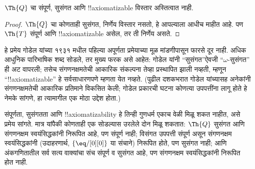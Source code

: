 \documentclass[../../../include/open-logic-section]{subfiles}
\begin{document}


\begin{thm}
$\Th{Q}$ चा संपूर्ण, सुसंगत आणि !!{axiomatizable} विस्तार
अस्तित्वात नाही.
\end{thm}

\begin{proof}
$\Th{Q}$ चा कोणताही सुसंगत, निर्णेय विस्तार नसतो, हे
आपल्याला आधीच माहीत आहे. पण $\Th{T}$ संपूर्ण आणि
!!{axiomatizable} असेल, तर ती निर्णेय असते.
\end{proof}

\begin{explain}
हे प्रमेय गोडेल यांच्या १९३१ मधील पहिल्या अपूर्णता प्रमेयाच्या
मूळ मांडणीपासून फारसे दूर नाही. अधिक आधुनिक पारिभाषिक शब्द
सोडले, तर मुख्य फरक असे आहेत: गोडेल यांनी ``सुसंगत''ऐवजी
``$\omega$-सुसंगत'' ही अट वापरली; तसेच संगणनक्षमतेची आकारिक
संकल्पना तेव्हा प्रस्थापित झाली नव्हती, म्हणून ``!!{axiomatizable}''
हे सर्वसाधारणपणे म्हणता येत नव्हते. (पुढील दशकभरात गोडेल
यांच्यासह अनेकांनी संगणनक्षमतेची आकारिक प्रतिमाने विकसित केली;
गोडेल प्रकारची घटना कोणत्या उपपत्तींना लागू होते हे नेमके
सांगणे, हा त्यामागील एक मोठा उद्देश होता.)

संपूर्णता, सुसंगतता आणि !!{axiomatizability} हे तिन्ही गुणधर्म
एकाच वेळी मिळू शकत नाहीत, असे प्रमेय सांगते. मात्र यांपैकी
कोणताही एक सोडल्यास उरलेले दोन मिळू शकतात: $\Th{Q}$ सुसंगत
आणि संगणनक्षम स्वयंसिद्धकांनी निरूपित आहे, पण संपूर्ण नाही;
विसंगत उपपत्ती संपूर्ण असून संगणनक्षम स्वयंसिद्धकांनी
(उदाहरणार्थ, $\{ \eq/[0][0] \}$ या संचाने) निरूपित होते,
पण सुसंगत नाही; आणि अंकगणितातील सर्व सत्य वाक्यांचा संच
संपूर्ण व सुसंगत आहे, पण संगणनक्षम स्वयंसिद्धकांनी
निरूपित होत नाही.
\end{explain}
\end{document}
